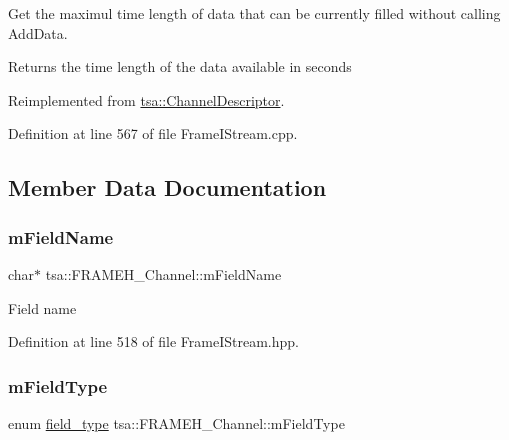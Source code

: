 Get the maximul time length of data that can be currently filled without calling Add\+Data.

\begin{DoxyReturn}{Returns}
the time length of the data available in seconds 
\end{DoxyReturn}


Reimplemented from \hyperlink{classtsa_1_1_channel_descriptor_a456d14e6136c389fbd307fabab7d7b73}{tsa\+::\+Channel\+Descriptor}.



Definition at line 567 of file Frame\+I\+Stream.\+cpp.



\subsection{Member Data Documentation}
\mbox{\label{classtsa_1_1_f_r_a_m_e_h___channel_aff87ea1426812c4e02ccaa741774db29}} 
\subsubsection{\texorpdfstring{m\+Field\+Name}{mFieldName}}
{\footnotesize\ttfamily char$\ast$ tsa\+::\+F\+R\+A\+M\+E\+H\+\_\+\+Channel\+::m\+Field\+Name\hspace{0.3cm}{\ttfamily [private]}}

Field name 

Definition at line 518 of file Frame\+I\+Stream.\+hpp.

\mbox{\label{classtsa_1_1_f_r_a_m_e_h___channel_a3a63c899c18c606c39c2cd32859d3b05}} 
\subsubsection{\texorpdfstring{m\+Field\+Type}{mFieldType}}
{\footnotesize\ttfamily enum \hyperlink{classtsa_1_1_f_r_a_m_e_h___channel_af9bd3bfda5ebc40f65e8af27abac9fe3}{field\+\_\+type} tsa\+::\+F\+R\+A\+M\+E\+H\+\_\+\+Channel\+::m\+Field\+Type\hspace{0.3cm}{\ttfamily [private]}}

